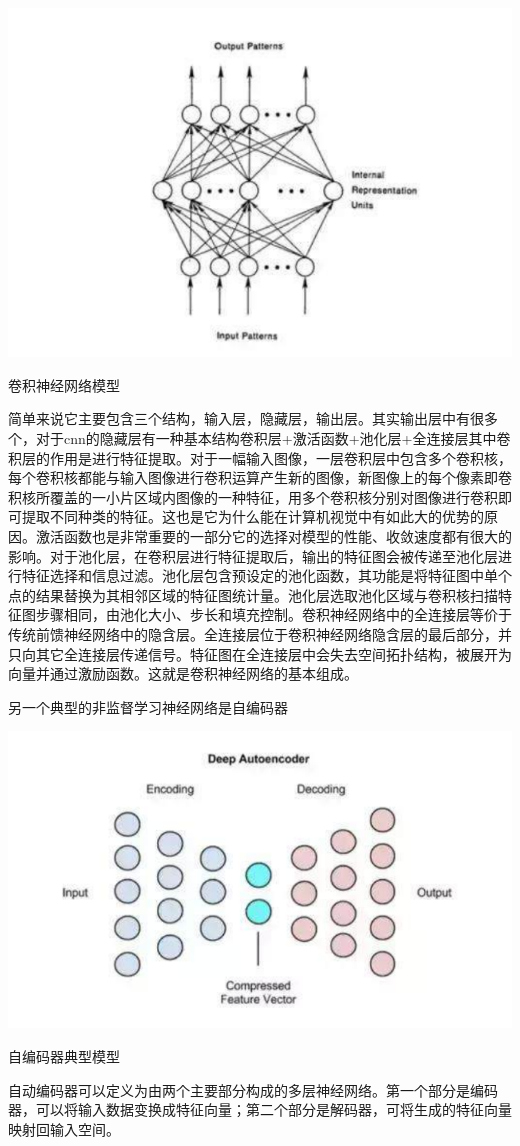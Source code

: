 \documentclass{article}
\begin{document}
\makeatother
\includegraphics[scale=0.9]{juanji}
\caption{卷积神经网络模型}
\label{fig:juanjishenjingwangluo}
简单来说它主要包含三个结构，输入层，隐藏层，输出层。其实输出层中有很多个，对于cnn的隐藏层有一种基本结构卷积层+激活函数+池化层+全连接层其中卷积层的作用是进行特征提取。对于一幅输入图像，一层卷积层中包含多个卷积核，每个卷积核都能与输入图像进行卷积运算产生新的图像，新图像上的每个像素即卷积核所覆盖的一小片区域内图像的一种特征，用多个卷积核分别对图像进行卷积即可提取不同种类的特征。这也是它为什么能在计算机视觉中有如此大的优势的原因。激活函数也是非常重要的一部分它的选择对模型的性能、收敛速度都有很大的影响。对于池化层，在卷积层进行特征提取后，输出的特征图会被传递至池化层进行特征选择和信息过滤。池化层包含预设定的池化函数，其功能是将特征图中单个点的结果替换为其相邻区域的特征图统计量。池化层选取池化区域与卷积核扫描特征图步骤相同，由池化大小、步长和填充控制。卷积神经网络中的全连接层等价于传统前馈神经网络中的隐含层。全连接层位于卷积神经网络隐含层的最后部分，并只向其它全连接层传递信号。特征图在全连接层中会失去空间拓扑结构，被展开为向量并通过激励函数。这就是卷积神经网络的基本组成。\par
另一个典型的非监督学习神经网络是自编码器
\makeatletter

\def\@captype{figure}

\makeatother
\includegraphics[scale=0.6]{zibianmaqi}
\caption{自编码器典型模型}
\label{fig:zibianmaqi}
自动编码器可以定义为由两个主要部分构成的多层神经网络。第一个部分是编码器，可以将输入数据变换成特征向量；第二个部分是解码器，可将生成的特征向量映射回输入空间。\par
\end{document}
